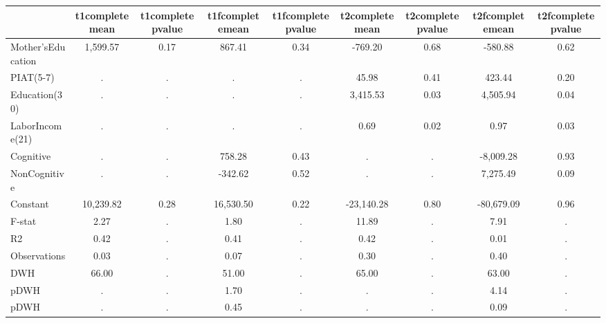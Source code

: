 \begin{table}[htbp]
\begin{tabular}{lcccccccc} \hline \hline
 & t1completemean  & t1completepvalue  & t1fcompletemean  & t1fcompletepvalue  & t2completemean  & t2completepvalue  & t2fcompletemean  & t2fcompletepvalue  \\  \hline 
Mother'sEducation &     1,599.57 &         0.17 &       867.41 &         0.34 &      -769.20 &         0.68 &      -580.88 &         0.62 \\  
PIAT(5-7) &            . &            . &            . &            . &        45.98 &         0.41 &       423.44 &         0.20 \\  
Education(30) &            . &            . &            . &            . &     3,415.53 &         0.03 &     4,505.94 &         0.04 \\  
LaborIncome(21) &            . &            . &            . &            . &         0.69 &         0.02 &         0.97 &         0.03 \\  
Cognitive &            . &            . &       758.28 &         0.43 &            . &            . &    -8,009.28 &         0.93 \\  
NonCognitive &            . &            . &      -342.62 &         0.52 &            . &            . &     7,275.49 &         0.09 \\  
Constant &    10,239.82 &         0.28 &    16,530.50 &         0.22 &   -23,140.28 &         0.80 &   -80,679.09 &         0.96 \\  
F-stat &         2.27 &            . &         1.80 &            . &        11.89 &            . &         7.91 &            . \\  
R2 &         0.42 &            . &         0.41 &            . &         0.42 &            . &         0.01 &            . \\  
Observations &         0.03 &            . &         0.07 &            . &         0.30 &            . &         0.40 &            . \\  
DWH &        66.00 &            . &        51.00 &            . &        65.00 &            . &        63.00 &            . \\  
pDWH &            . &            . &         1.70 &            . &            . &            . &         4.14 &            . \\  
pDWH &            . &            . &         0.45 &            . &            . &            . &         0.09 &            . \\  
\hline \hline \end{tabular}
\end{table}
